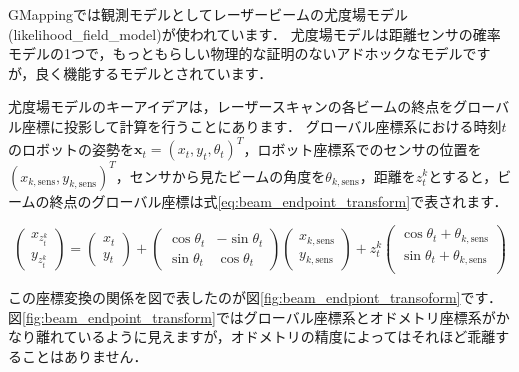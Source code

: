 \documentclass[{../../master}]{subfiles}
\begin{document}
GMappingでは観測モデルとしてレーザービームの尤度場モデル(\textsf{likelihood\_field\_model})が使われています．
尤度場モデルは距離センサの確率モデルの1つで，もっともらしい物理的な証明のないアドホックなモデルですが，良く機能するモデルとされています．

尤度場モデルのキーアイデアは，レーザースキャンの各ビームの終点をグローバル座標に投影して計算を行うことにあります．
グローバル座標系における時刻$t$のロボットの姿勢を$\bm{x}_{t} = (x_{t}, y_{t}, \theta_{t})^T$，ロボット座標系でのセンサの位置を$(x_{k, \text{sens}}, y_{k, \text{sens}})^T$，センサから見たビームの角度を$\theta_{k, \text{sens}}$，距離を$z_{t}^{k}$とすると，ビームの終点のグローバル座標は式\ref{eq:beam_endpoint_transform}で表されます．

\begin{equation}
  \begin{pmatrix}
    x_{z_{t}^{k}} \\
    y_{z_{t}^{k}}
  \end{pmatrix}
  =
  \begin{pmatrix}
    x_{t} \\
    y_{t}
  \end{pmatrix}
  +
  \begin{pmatrix}
    \cos{\theta_{t}} & -\sin{\theta_{t}} \\
    \sin{\theta_{t}} & \cos{\theta_{t}}
  \end{pmatrix}
  \begin{pmatrix}
    x_{k, \text{sens}} \\
    y_{k, \text{sens}}
  \end{pmatrix}
  + z_{t}^{k}
  \begin{pmatrix}
    \cos{\theta_{t} + \theta_{k, \text{sens}}} \\
    \sin{\theta_{t} + \theta_{k, \text{sens}}} \\
  \end{pmatrix}
  \label{eq:beam_endpoint_transform}
\end{equation}

この座標変換の関係を図で表したのが図\ref{fig:beam_endpiont_transoform}です．
図\ref{fig:beam_endpoint_transform}ではグローバル座標系とオドメトリ座標系がかなり離れているように見えますが，オドメトリの精度によってはそれほど乖離することはありません．
\end{document}
